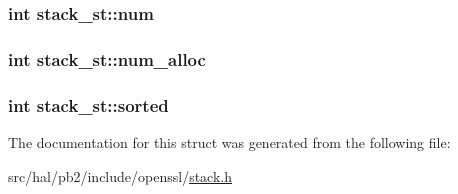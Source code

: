 \subsubsection[{\texorpdfstring{num}{num}}]{\setlength{\rightskip}{0pt plus 5cm}int stack\+\_\+st\+::num}\hypertarget{structstack__st_af60cc588694f5798623d33fe70946748}{}\label{structstack__st_af60cc588694f5798623d33fe70946748}
\subsubsection[{\texorpdfstring{num\+\_\+alloc}{num_alloc}}]{\setlength{\rightskip}{0pt plus 5cm}int stack\+\_\+st\+::num\+\_\+alloc}\hypertarget{structstack__st_a4ad771fe5551133410de60b2e8b2028d}{}\label{structstack__st_a4ad771fe5551133410de60b2e8b2028d}
\subsubsection[{\texorpdfstring{sorted}{sorted}}]{\setlength{\rightskip}{0pt plus 5cm}int stack\+\_\+st\+::sorted}\hypertarget{structstack__st_a8bc2f5dfd119fa8339637dfbca8251d9}{}\label{structstack__st_a8bc2f5dfd119fa8339637dfbca8251d9}


The documentation for this struct was generated from the following file\+:\begin{DoxyCompactItemize}
\item 
src/hal/pb2/include/openssl/\hyperlink{stack_8h}{stack.\+h}\end{DoxyCompactItemize}
